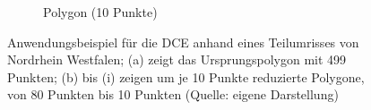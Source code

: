 {\begin{figure}[ht]
\begin{subfigure}[b]{0.30\textwidth}
            \caption{Polygon (10 Punkte)}
		\end{subfigure}
		\caption[Anwendungsbeispiel für DCE aus eigenen Daten]{Anwendungsbeispiel für die DCE anhand eines Teilumrisses von Nordrhein Westfalen; (a) zeigt das Ursprungspolygon mit 499 Punkten; (b) bis (i) zeigen um je 10 Punkte reduzierte Polygone, von 80 Punkten bis 10 Punkten (Quelle: eigene Darstellung)}
		\label{Scr:DCE_test_run_nrw}
	\end{figure}





    \clearpage
}

